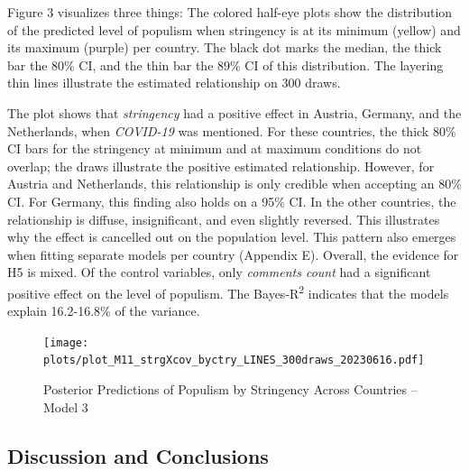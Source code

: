 \documentclass[
]{ccr}
\begin{document}
Figure 3 visualizes three things: The colored half-eye plots show the
distribution of the predicted level of populism when stringency is at
its minimum (yellow) and its maximum (purple) per country. The black dot
marks the median, the thick bar the 80\% CI, and the thin bar the 89\%
CI of this distribution. The layering thin lines illustrate the
estimated relationship on 300 draws.

The plot shows that \emph{stringency} had a positive effect in Austria,
Germany, and the Netherlands, when \emph{COVID-19} was mentioned. For
these countries, the thick 80\% CI bars for the stringency at minimum
and at maximum conditions do not overlap; the draws illustrate the
positive estimated relationship. However, for Austria and Netherlands,
this relationship is only credible when accepting an 80\% CI. For
Germany, this finding also holds on a 95\% CI. In the other countries,
the relationship is diffuse, insignificant, and even slightly reversed.
This illustrates why the effect is cancelled out on the population
level. This pattern also emerges when fitting separate models per
country (Appendix E). Overall, the evidence for H5 is mixed. Of the
control variables, only \emph{comments count} had a significant positive
effect on the level of populism. The Bayes-R\textsuperscript{2}
indicates that the models explain 16.2-16.8\% of the variance.

\begin{figure}

{\centering \texttt{[image: plots/plot\_M11\_strgXcov\_byctry\_LINES\_300draws\_20230616.pdf]}

}

\caption{Posterior Predictions of Populism by Stringency Across
Countries -- Model 3}

\end{figure}

\hypertarget{discussion-and-conclusions}{%
\subsection{Discussion and
Conclusions}\label{discussion-and-conclusions}}
\end{document}
